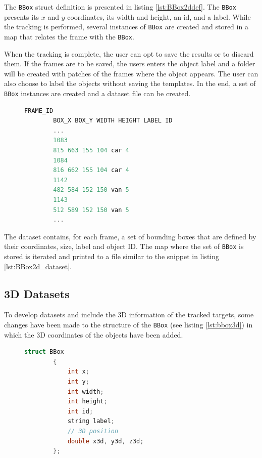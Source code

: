 The \texttt{BBox} struct definition is presented in listing \ref{lst:BBox2ddef}. The \texttt{BBox} presents its $x$ and $y$ coordinates, its width and height, an id, and a label. While the tracking is performed, several instances of \texttt{BBox} are created and stored in a map that relates the frame with the \texttt{BBox}. 

When the tracking is complete, the user can opt to save the results or to discard them. If the frames are to be saved, the users enters the object label and a folder will be created with patches of the frames where the object appears. The user can also choose to label the objects without saving the templates. In the end, a set of \texttt{BBox} instances are created and a dataset file can be created.

\begin{figure}
	\begin{center}
		\begin{lstlisting}[label={lst:BBox2d_dataset}, caption={2D dataset example snippet},language=c++]
		FRAME_ID 
		BOX_X BOX_Y WIDTH HEIGHT LABEL ID
		...
		1083
		815 663 155 104 car 4
		1084
		816 662 155 104 car 4
		1142
		482 584 152 150 van 5
		1143
		512 589 152 150 van 5
		...\end{lstlisting}
	\end{center}
\end{figure}

The dataset contains, for each frame, a set of bounding boxes that are defined by their coordinates, size, label and object ID. The map where the set of \texttt{BBox} is stored is iterated and printed to a file similar to the snippet in listing \ref{lst:BBox2d_dataset}.


\subsection{3D Datasets}

To develop datasets and include the 3D information of the tracked targets, some changes have been made to the structure of the \texttt{BBox} (see listing \ref{lst:bbox3d}) in which the 3D coordinates of the objects have been added.

\begin{figure}
	\begin{center}
		\begin{lstlisting}[label={lst:bbox3d}, caption={BBox struct definition with 3D capabilities},language=c++]
		struct BBox
		{
			int x;
			int y;
			int width;
			int height;
			int id;
			string label;
			// 3D position
			double x3d, y3d, z3d;
		};		\end{lstlisting}
	\end{center}
\end{figure}

